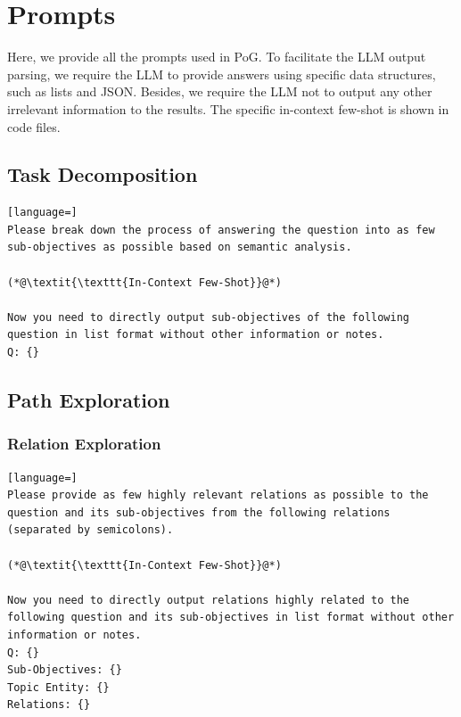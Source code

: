\documentclass{article}
\begin{document}
\section{Prompts}

Here, we provide all the prompts used in PoG. To facilitate the LLM output parsing, we require the LLM to provide answers using specific data structures, such as lists and JSON.
Besides, we require the LLM not to output any other irrelevant information to the results. The specific in-context few-shot is shown in code files.
\subsection{Task Decomposition}
\label{prompt:td}


\begin{lstlisting}[language=]
Please break down the process of answering the question into as few sub-objectives as possible based on semantic analysis.

(*@\textit{\texttt{In-Context Few-Shot}}@*)

Now you need to directly output sub-objectives of the following question in list format without other information or notes. 
Q: {}
\end{lstlisting}



\subsection{Path Exploration}
\subsubsection{Relation Exploration }
\label{prompt:re}
\begin{lstlisting}[language=]
Please provide as few highly relevant relations as possible to the question and its sub-objectives from the following relations (separated by semicolons).

(*@\textit{\texttt{In-Context Few-Shot}}@*)

Now you need to directly output relations highly related to the following question and its sub-objectives in list format without other information or notes.
Q: {}
Sub-Objectives: {}
Topic Entity: {}
Relations: {}
\end{lstlisting}
\end{document}
